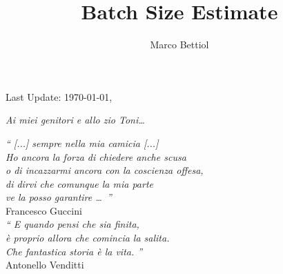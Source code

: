 \documentclass[11pt,a4paper,twoside,openright]{book}
\title{Batch Size Estimate}
\author{Marco Bettiol}
\begin{document}


\thispagestyle{empty}
\clearpage
\null{}
\begin{center}
{\large Last Update: \today,  \ \currenttime}
\end{center}
\null{}


\frontmatter
\cleardoublepage
\begin{flushright}
\null{}
\emph{\large 
Ai miei genitori e allo zio Toni\ldots\\}
\null
\end{flushright}

\cleardoublepage
\begin{flushright}
\null{}
\emph{`` [...] sempre nella mia camicia [...]\\
Ho ancora la forza di chiedere anche scusa\\
o di incazzarmi ancora con la coscienza offesa,\\
di dirvi che comunque la mia parte\\ 
ve la posso garantire \ldots\ ''\\}
{\sc Francesco Guccini\\} 
\null
\emph{`` E quando pensi che sia finita,\\
è proprio allora che comincia la salita.\\ 
Che fantastica storia è la vita.  ''\\}
{\sc Antonello Venditti} 
\null
\end{flushright}
\end{document}
